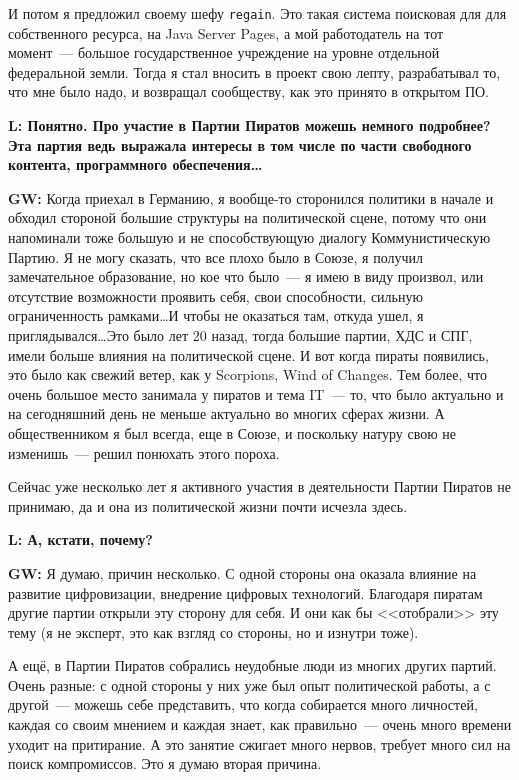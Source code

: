 \documentclass[10pt, a5paper]{article}
\begin{document}
\begin{Parallel}[p]{}{}
{И потом я предложил своему шефу \verb!regain!. Это такая система поисковая для для собственного ресурса, на Java Server Pages, а мой работодатель на тот момент~--- большое государственное учреждение на уровне отдельной федеральной земли. Тогда я стал вносить в проект свою лепту, разрабатывал то, что мне было надо, и возвращал сообществу, как это принято в открытом ПО.

{\noindent \bf L: Понятно. Про участие в Партии Пиратов можешь немного подробнее? Эта партия ведь выражала интересы в том числе по части свободного контента, программного обеспечения\ldots}

{\noindent \bf GW:} Когда приехал в Германию, я вообще-то сторонился политики в начале и обходил стороной большие структуры на политической сцене, потому что они напоминали тоже большую и не способствующую диалогу Коммунистическую Партию. Я не могу сказать, что все плохо было в Союзе, я получил замечательное образование, но кое что было~--- я имею в виду произвол, или отсутствие возможности проявить себя, свои способности, сильную ограниченность рамками\ldots И чтобы не оказаться там, откуда ушел, я приглядывался\ldots Это было лет 20 назад, тогда большие партии, ХДС и СПГ, имели больше влияния на политической сцене. И вот когда пираты появились, это было как свежий ветер, как у Scorpions, Wind of Changes. Тем более, что очень большое место занимала у пиратов и тема IT~--- то, что было актуально и на сегодняшний день не меньше актуально во многих сферах жизни. А общественником я был всегда, еще в Союзе, и поскольку натуру свою не изменишь~--- решил понюхать этого пороха. 

Сейчас уже несколько лет я активного участия в деятельности Партии Пиратов не принимаю, да и она из политической жизни почти исчезла здесь. 
 
{\noindent \bf L: А, кстати, почему?}

{\noindent \bf GW:} Я думаю, причин несколько. С одной стороны она оказала влияние на развитие цифровизации, внедрение цифровых технологий. Благодаря пиратам другие партии открыли эту сторону для себя. И они как бы <<отобрали>> эту тему (я не эксперт, это как взгляд со стороны, но и изнутри тоже). 

А ещё, в Партии Пиратов собрались неудобные люди из многих других партий. Очень разные: с одной стороны у них уже был опыт политической работы, а с другой~--- можешь себе представить, что когда собирается много личностей, каждая со своим мнением и каждая знает, как правильно~--- очень много времени уходит на притирание. А это занятие сжигает много нервов, требует много сил  на поиск компромиссов. Это я думаю вторая причина. 

}
\end{Parallel}
\end{document}
